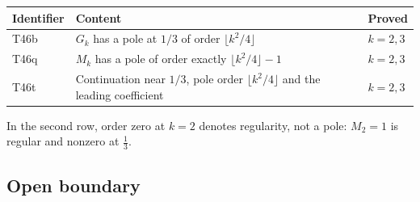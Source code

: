 \documentclass[
  11pt,
]{article}
\begin{document}
\begin{longtable}[]{@{}lll@{}}
\toprule
\begin{minipage}[b]{0.18\columnwidth}\raggedright
Identifier\strut
\end{minipage} & \begin{minipage}[b]{0.58\columnwidth}\raggedright
Content\strut
\end{minipage} & \begin{minipage}[b]{0.16\columnwidth}\raggedright
Proved\strut
\end{minipage}\tabularnewline
\midrule
\endhead
\begin{minipage}[t]{0.18\columnwidth}\raggedright
T46b\strut
\end{minipage} & \begin{minipage}[t]{0.58\columnwidth}\raggedright
\(G_k\) has a pole at \(1/3\) of order \(\lfloor k^2/4\rfloor\)\strut
\end{minipage} & \begin{minipage}[t]{0.16\columnwidth}\raggedright
\(k=2,3\)\strut
\end{minipage}\tabularnewline
\begin{minipage}[t]{0.18\columnwidth}\raggedright
T46q\strut
\end{minipage} & \begin{minipage}[t]{0.58\columnwidth}\raggedright
\(M_k\) has a pole of order exactly \(\lfloor k^2/4\rfloor-1\)\strut
\end{minipage} & \begin{minipage}[t]{0.16\columnwidth}\raggedright
\(k=2,3\)\strut
\end{minipage}\tabularnewline
\begin{minipage}[t]{0.18\columnwidth}\raggedright
T46t\strut
\end{minipage} & \begin{minipage}[t]{0.58\columnwidth}\raggedright
Continuation near \(1/3\), pole order \(\lfloor k^2/4\rfloor\) and the
leading coefficient\strut
\end{minipage} & \begin{minipage}[t]{0.16\columnwidth}\raggedright
\(k=2,3\)\strut
\end{minipage}\tabularnewline
\bottomrule
\end{longtable}

In the second row, order zero at \(k=2\) denotes regularity, not a pole:
\(M_2=1\) is regular and nonzero at \(\frac13\).

\hypertarget{open-boundary-7}{%
\subsection{Open boundary}\label{open-boundary-7}}
\end{document}
